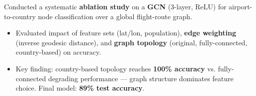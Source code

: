 Conducted a systematic \textbf{ablation study} on a \textbf{GCN} (3-layer, ReLU) for airport-to-country node classification over a global flight-route graph.
\begin{itemize}
\item Evaluated impact of feature sets (lat/lon, population), \textbf{edge weighting} (inverse geodesic distance), and \textbf{graph topology} (original, fully-connected, country-based) on accuracy.
\item Key finding: country-based topology reaches \textbf{100\% accuracy} vs. fully-connected degrading performance — graph structure dominates feature choice. Final model: \textbf{89\% test accuracy}.
\end{itemize}
{\LaTeXraggedright
{}
\par}